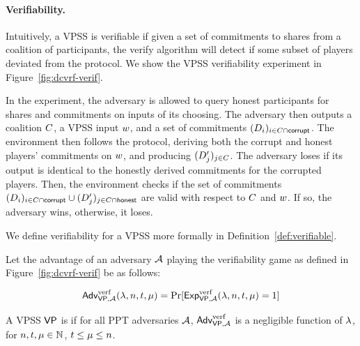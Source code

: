 \paragraph{Verifiability.}
Intuitively,
a VPSS is verifiable if given a set of commitments to shares from a coalition of participants,
the verify algorithm will detect if some subset of players deviated from the protocol.
We show the VPSS verifiability experiment in Figure~\ref{fig:dcvrf-verif}.

In the experiment,
the adversary is allowed to query honest participants for shares and commitments on inputs of its choosing.
The adversary then outputs a coalition $C$,
a VPSS input $w$,
and a set of commitments
$(D_i)_{i \in C \cap \mathsf{corrupt}}$.
The environment then follows the protocol, deriving both the corrupt and honest players' commitments on $w$,
and producing
$(D_j')_{j \in C}$.
The adversary loses if its output is identical to the honestly derived commitments for the corrupted players.
%
Then,
the environment checks if the set of commitments
$(D_i)_{i \in C \cap \mathsf{corrupt}} \cup (D_j')_{j \in C \cap \mathsf{honest}}$ are valid with respect to $C$ and $w$.
If so,
the adversary wins,
otherwise,
it loses.

We define verifiability for a VPSS more formally in Definition~\ref{def:verifiable}.

\begin{definition} \label{def:verifiable}
Let the advantage of an adversary $\mathcal{A}$ playing the verifiability game as
defined in Figure~\ref{fig:dcvrf-verif} be as follows:

\[
  \textsf{\upshape Adv}^{\textrm{\upshape verf}}_{\mathsf{VP},\mathcal{A}}(\lambda, n, t, \mu)
  = \Pr[ \textsf{\upshape Exp}^{\textrm{\upshape verf}}_{\mathsf{VP},\mathcal{A}}(\lambda, n, t, \mu)= 1]
\]

  A VPSS $\mathsf{VP}$ is  if for all PPT adversaries $\mathcal{A}$,
  $\textsf{\upshape Adv}^{\textrm{\upshape verf}}_{\mathsf{VP},\mathcal{A}}$ is a negligible function of $\lambda$,
  for $n, t, \mu \in \mathbb{N}$,
  $t \leq \mu \leq n$.
\end{definition}

